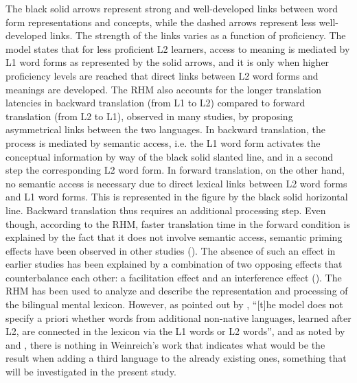 \documentclass[output=paper,colorlinks,citecolor=brown,nonflat]{langsci/langscibook}
\begin{document}
The black solid arrows represent strong and well-developed links between word form representations and concepts, while the dashed arrows represent less well-developed links. The strength of the links varies as a function of proficiency. The model states that for less proficient L2 learners, access to meaning is mediated by L1 word forms as represented by the solid arrows, and it is only when higher proficiency levels are reached that direct links between L2 word forms and meanings are developed. The RHM also accounts for the longer translation latencies in backward translation (from L1 to L2) compared to forward translation (from L2 to L1), observed in many studies, by proposing asymmetrical links between the two languages. In backward translation, the process is mediated by semantic access, i.e. the L1 word form activates the conceptual information by way of the black solid slanted line, and in a second step the corresponding L2 word form. In forward translation, on the other hand, no semantic access is necessary due to direct lexical links between L2 word forms and L1 word forms. This is represented in the figure by the black solid horizontal line. Backward translation thus requires an additional processing step. Even though, according to the RHM, faster translation time in the forward condition is explained by the fact that it does not involve semantic access, semantic priming effects have been observed in other studies (\citealt{DuyckBrysbaert2002, SchoonbaertEtAl2009}). The absence of such an effect in earlier studies has been explained by a combination of two opposing effects that counterbalance each other: a facilitation effect and an interference effect (\citealt{WuJuffs2019}). The RHM has been used to analyze and describe the representation and processing of the bilingual mental lexicon. However, as pointed out by \citet[236]{GoralEtAl2006}, “[t]he model does not specify a priori whether words from additional non-native languages, learned after L2, are connected in the lexicon via the L1 words or L2 words”, and as noted by \citet{Singleton2003} and \citet{DeAngelis2007}, there is nothing in Weinreich’s work that indicates what would be the result when adding a third language to the already existing ones, something that will be investigated in the present study.
\end{document}

